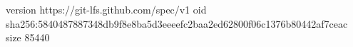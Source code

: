version https://git-lfs.github.com/spec/v1
oid sha256:5840487887348db9f8e8ba5d3eeeefc2baa2ed62800f06c1376b80442af7ceac
size 85440
